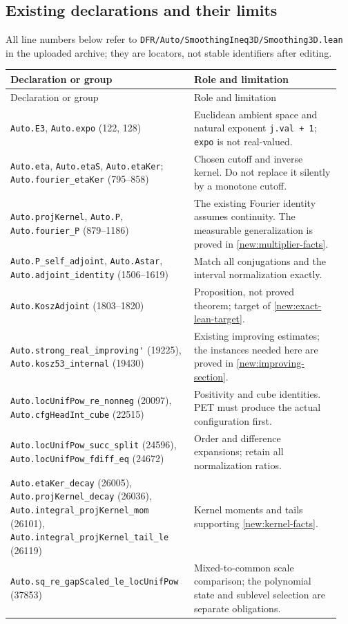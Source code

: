 \documentclass[11pt]{article}
\theoremstyle{definition}
\newcommand{\pid}[1]{\nolinkurl{#1}}
\begin{document}
\subsection{Existing declarations and their limits}
All line numbers below refer to
\pid{DFR/Auto/SmoothingIneq3D/Smoothing3D.lean} in the uploaded archive; they are locators,
not stable identifiers after editing.
\begin{longtable}{@{}p{0.52\linewidth}p{0.43\linewidth}@{}}
\toprule Declaration or group & Role and limitation \\
\midrule\endfirsthead
\toprule Declaration or group & Role and limitation \\
\midrule\endhead
\pid{Auto.E3}, \pid{Auto.expo} (122, 128) & Euclidean ambient space and natural exponent
\pid{j.val + 1}; \pid{expo} is not real-valued. \\
\pid{Auto.eta}, \pid{Auto.etaS}, \pid{Auto.etaKer};
\pid{Auto.fourier_etaKer} (795--858) & Chosen cutoff and inverse kernel. Do not replace it
silently by a monotone cutoff. \\
\pid{Auto.projKernel}, \pid{Auto.P}, \pid{Auto.fourier_P} (879--1186) & The existing Fourier
identity assumes continuity. The measurable generalization is proved in
\cref{new:multiplier-facts}. \\
\pid{Auto.P_self_adjoint}, \pid{Auto.Astar}, \pid{Auto.adjoint_identity} (1506--1619) & Match
all conjugations and the interval normalization exactly. \\
\pid{Auto.KoszAdjoint} (1803--1820) & Proposition, not proved theorem; target of
\cref{new:exact-lean-target}. \\
\pid{Auto.strong_real_improving'} (19225), \pid{Auto.kosz53_internal} (19430) & Existing
improving estimates; the instances needed here are proved in \cref{new:improving-section}. \\
\pid{Auto.locUnifPow_re_nonneg} (20097), \pid{Auto.cfgHeadInt_cube} (22515) & Positivity and
cube identities. PET must produce the actual configuration first. \\
\pid{Auto.locUnifPow_succ_split} (24596), \pid{Auto.locUnifPow_fdiff_eq} (24672) & Order and
difference expansions; retain all normalization ratios. \\
\pid{Auto.etaKer_decay} (26005), \pid{Auto.projKernel_decay} (26036),
\pid{Auto.integral_projKernel_mom} (26101), \pid{Auto.integral_projKernel_tail_le} (26119) &
Kernel moments and tails supporting \cref{new:kernel-facts}. \\
\pid{Auto.sq_re_gapScaled_le_locUnifPow} (37853) & Mixed-to-common scale comparison; the
polynomial state and sublevel selection are separate obligations. \\
\bottomrule
\end{longtable}
\end{document}

